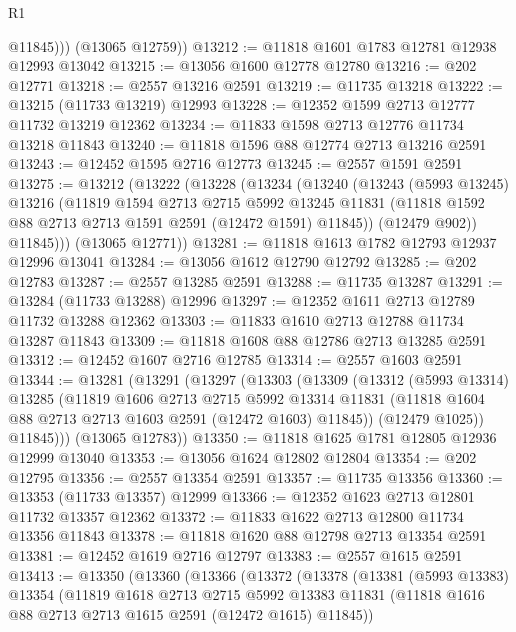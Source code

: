 \begin{lexlean}{R1}
\begin{coremodule}
            @11845)))
      (@13065 @12759))
@13212 := @11818 @1601 @1783 @12781 @12938 @12993 @13042
@13215 := @13056 @1600 @12778 @12780
@13216 := @202 @12771
@13218 := @2557 @13216 @2591
@13219 := @11735 @13218
@13222 := @13215 (@11733 @13219) @12993
@13228 := @12352 @1599 @2713 @12777 @11732 @13219 @12362
@13234 := @11833 @1598 @2713 @12776 @11734 @13218 @11843
@13240 := @11818 @1596 @88 @12774 @2713 @13216 @2591
@13243 := @12452 @1595 @2716 @12773
@13245 := @2557 @1591 @2591
@13275 := @13212
    (@13222
      (@13228
        (@13234
          (@13240
            (@13243
              (@5993 @13245)
              @13216
              (@11819
                @1594
                @2713
                @2715
                @5992
                @13245
                @11831
                (@11818 @1592 @88 @2713 @2713 @1591 @2591 (@12472 @1591) @11845))
              (@12479 @902))
            @11845)))
      (@13065 @12771))
@13281 := @11818 @1613 @1782 @12793 @12937 @12996 @13041
@13284 := @13056 @1612 @12790 @12792
@13285 := @202 @12783
@13287 := @2557 @13285 @2591
@13288 := @11735 @13287
@13291 := @13284 (@11733 @13288) @12996
@13297 := @12352 @1611 @2713 @12789 @11732 @13288 @12362
@13303 := @11833 @1610 @2713 @12788 @11734 @13287 @11843
@13309 := @11818 @1608 @88 @12786 @2713 @13285 @2591
@13312 := @12452 @1607 @2716 @12785
@13314 := @2557 @1603 @2591
@13344 := @13281
    (@13291
      (@13297
        (@13303
          (@13309
            (@13312
              (@5993 @13314)
              @13285
              (@11819
                @1606
                @2713
                @2715
                @5992
                @13314
                @11831
                (@11818 @1604 @88 @2713 @2713 @1603 @2591 (@12472 @1603) @11845))
              (@12479 @1025))
            @11845)))
      (@13065 @12783))
@13350 := @11818 @1625 @1781 @12805 @12936 @12999 @13040
@13353 := @13056 @1624 @12802 @12804
@13354 := @202 @12795
@13356 := @2557 @13354 @2591
@13357 := @11735 @13356
@13360 := @13353 (@11733 @13357) @12999
@13366 := @12352 @1623 @2713 @12801 @11732 @13357 @12362
@13372 := @11833 @1622 @2713 @12800 @11734 @13356 @11843
@13378 := @11818 @1620 @88 @12798 @2713 @13354 @2591
@13381 := @12452 @1619 @2716 @12797
@13383 := @2557 @1615 @2591
@13413 := @13350
    (@13360
      (@13366
        (@13372
          (@13378
            (@13381
              (@5993 @13383)
              @13354
              (@11819
                @1618
                @2713
                @2715
                @5992
                @13383
                @11831
                (@11818 @1616 @88 @2713 @2713 @1615 @2591 (@12472 @1615) @11845))

\end{coremodule}
\end{lexlean}
